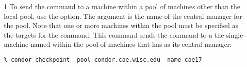 \begin{ManPage}{\label{man-condor-checkpoint}}{1}
To send the  command to a machine
within a pool of machines other than the local pool,
use the  option.
The argument is the name of the central manager for the pool.
Note that one or more machines within the pool must be
specified as the targets for the command.
This command sends the command to
a the single machine named  within the
pool of machines that has  as
its central manager:
\begin{verbatim}
% condor_checkpoint -pool condor.cae.wisc.edu -name cae17
\end{verbatim}

\end{ManPage}

